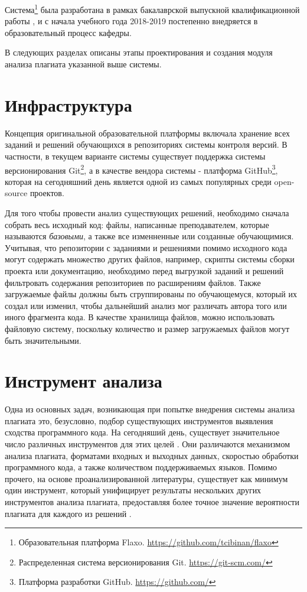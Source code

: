\documentclass{article}
\begin{document}
Система\footnote{Образовательная платформа Flaxo. \url{https://github.com/tcibinan/flaxo}} была разработана в рамках бакалаврской выпускной квалификационной работы \citep{flaxoThesis}, и с начала учебного года 2018-2019 постепенно внедряется в образовательный процесс кафедры.

В следующих разделах описаны этапы проектирования и создания модуля анализа плагиата указанной выше системы.

\section{Инфраструктура}

Концепция оригинальной образовательной платформы включала хранение всех заданий и решений обучающихся в репозиториях системы контроля версий. В частности, в текущем варианте системы существует поддержка системы версионирования Git\footnote{Распределенная система версионирования Git. \url{https://git-scm.com/}}, а в качестве вендора системы - платформа GitHub\footnote{Платформа разработки GitHub. \url{https://github.com/}}, которая на сегодняшний день является одной из самых популярных среди open-source проектов.

Для того чтобы провести анализ существующих решений, необходимо сначала собрать весь исходный код: файлы, написанные преподавателем, которые называются \textit{базовыми}, а также все изменненные или созданные обучающимися. Учитывая, что репозитории с заданиями и решениями помимо исходного кода могут содержать множество других файлов, например, скрипты системы сборки проекта или документацию, необходимо перед выгрузкой заданий и решений фильтровать содержания репозиториев по расширениям файлов. Также загружаемые файлы должны быть сгруппированы по обучающемуся, который их создал или изменил, чтобы дальнейший анализ мог различать автора того или иного фрагмента кода. В качестве хранилища файлов, можно использовать файловую систему, поскольку количество и размер загружаемых файлов могут быть значительными.

\section{Инструмент анализа}

Одна из основных задач, возникающая при попытке внедрения системы анализа плагиата это, безусловно, подбор существующих инструментов выявления сходства программного кода. На сегодняший день, существует значительное число различных инструментов для этих целей \citep{plagiarismToolsSurvey}. Они различаются механизмом анализа плагиата, форматами входных и выходных данных, скоростью обработки программного кода, а также количеством поддерживаемых языков. Помимо прочего, на основе проанализированной литературы, существует как минимум один инструмент, который унифицирует результаты нескольких других инструментов анализа плагиата, предоставляя более точное значение вероятности плагиата для каждого из решений \citep{unifiedPlagiarismDetectionTool}.
\end{document}
